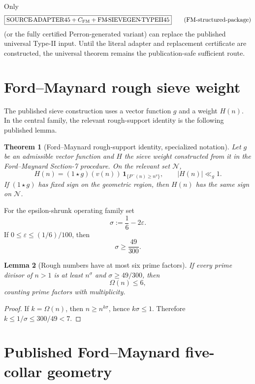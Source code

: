 \documentclass[11pt]{article}
\newtheorem{theorem}{Theorem}[section]
\newtheorem{lemma}[theorem]{Lemma}
\theoremstyle{definition}
\theoremstyle{remark}
\newcommand{\1}{\mathbf 1}
\begin{document}
Only
\[
 \boxed{\mathrm{SOURCE\!\mbox{-}ADAPTER45}+C_{\rm FM}
 +\mathrm{FM\!\mbox{-}SIEVEGEN\!\mbox{-}TYPEII45}}
\tag{FM-structured-package}
\]
(or the fully certified Perron-generated variant) can replace the published universal Type-II input.  Until the
literal adapter and replacement certificate are constructed, the universal theorem remains the publication-safe
sufficient route.

\section{Ford--Maynard rough sieve weight}

The published sieve construction uses a vector function $g$ and a weight $H(n)$.  In the central family, the
relevant rough-support identity is the following published lemma.

\begin{theorem}[Ford--Maynard rough-support identity, specialized notation]\label{thm:FM718}
Let $g$ be an admissible vector function and $H$ the sieve weight constructed from it in the Ford--Maynard
Section-7 procedure.  On the relevant set $\mathcal N$,
\[
 \boxed{H(n)=(1\star g)(v(n))\,\1_{\{P^-(n)\ge n^\nu\}},
 \qquad |H(n)|\ll_g1.}
\tag{FM-H}
\]
If $(1\star g)$ has fixed sign on the geometric region, then $H(n)$ has the same sign on $\mathcal N$.
\end{theorem}

For the epsilon-shrunk operating family set
\[
 \sigma:=\frac16-2\varepsilon.
\]
If $0\le\varepsilon\le(1/6)/100$, then
\[
 \sigma\ge\frac{49}{300}.
\]

\begin{lemma}[Rough numbers have at most six prime factors]\label{lem:omega6}
If every prime divisor of $n>1$ is at least $n^\sigma$ and $\sigma\ge49/300$, then
\[
 \boxed{\Omega(n)\le6,}
\]
counting prime factors with multiplicity.
\end{lemma}
\begin{proof}
If $k=\Omega(n)$, then $n\ge n^{k\sigma}$, hence $k\sigma\le1$.  Therefore
$k\le1/\sigma\le300/49<7$.
\end{proof}

\section{Published Ford--Maynard five-collar geometry}
\label{sec:fm-five-collar}
\end{document}
